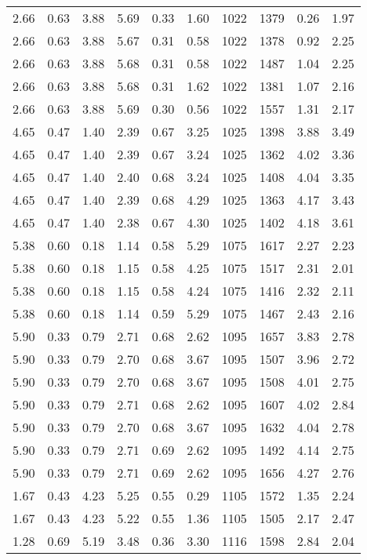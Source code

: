 \begin{longtable}{rrrrrrrrrr}
2.66	&	0.63	&	3.88	&	5.69	&	0.33	&	1.60	&	1022	&	1379	&	0.26	&	1.97	\\
2.66	&	0.63	&	3.88	&	5.67	&	0.31	&	0.58	&	1022	&	1378	&	0.92	&	2.25	\\
2.66	&	0.63	&	3.88	&	5.68	&	0.31	&	0.58	&	1022	&	1487	&	1.04	&	2.25	\\
2.66	&	0.63	&	3.88	&	5.68	&	0.31	&	1.62	&	1022	&	1381	&	1.07	&	2.16	\\
2.66	&	0.63	&	3.88	&	5.69	&	0.30	&	0.56	&	1022	&	1557	&	1.31	&	2.17	\\
4.65	&	0.47	&	1.40	&	2.39	&	0.67	&	3.25	&	1025	&	1398	&	3.88	&	3.49	\\
4.65	&	0.47	&	1.40	&	2.39	&	0.67	&	3.24	&	1025	&	1362	&	4.02	&	3.36	\\
4.65	&	0.47	&	1.40	&	2.40	&	0.68	&	3.24	&	1025	&	1408	&	4.04	&	3.35	\\
4.65	&	0.47	&	1.40	&	2.39	&	0.68	&	4.29	&	1025	&	1363	&	4.17	&	3.43	\\
4.65	&	0.47	&	1.40	&	2.38	&	0.67	&	4.30	&	1025	&	1402	&	4.18	&	3.61	\\
5.38	&	0.60	&	0.18	&	1.14	&	0.58	&	5.29	&	1075	&	1617	&	2.27	&	2.23	\\
5.38	&	0.60	&	0.18	&	1.15	&	0.58	&	4.25	&	1075	&	1517	&	2.31	&	2.01	\\
5.38	&	0.60	&	0.18	&	1.15	&	0.58	&	4.24	&	1075	&	1416	&	2.32	&	2.11	\\
5.38	&	0.60	&	0.18	&	1.14	&	0.59	&	5.29	&	1075	&	1467	&	2.43	&	2.16	\\
5.90	&	0.33	&	0.79	&	2.71	&	0.68	&	2.62	&	1095	&	1657	&	3.83	&	2.78	\\
5.90	&	0.33	&	0.79	&	2.70	&	0.68	&	3.67	&	1095	&	1507	&	3.96	&	2.72	\\
5.90	&	0.33	&	0.79	&	2.70	&	0.68	&	3.67	&	1095	&	1508	&	4.01	&	2.75	\\
5.90	&	0.33	&	0.79	&	2.71	&	0.68	&	2.62	&	1095	&	1607	&	4.02	&	2.84	\\
5.90	&	0.33	&	0.79	&	2.70	&	0.68	&	3.67	&	1095	&	1632	&	4.04	&	2.78	\\
5.90	&	0.33	&	0.79	&	2.71	&	0.69	&	2.62	&	1095	&	1492	&	4.14	&	2.75	\\
5.90	&	0.33	&	0.79	&	2.71	&	0.69	&	2.62	&	1095	&	1656	&	4.27	&	2.76	\\
1.67	&	0.43	&	4.23	&	5.25	&	0.55	&	0.29	&	1105	&	1572	&	1.35	&	2.24	\\
1.67	&	0.43	&	4.23	&	5.22	&	0.55	&	1.36	&	1105	&	1505	&	2.17	&	2.47	\\
1.28	&	0.69	&	5.19	&	3.48	&	0.36	&	3.30	&	1116	&	1598	&	2.84	&	2.04	\\

\end{longtable}
